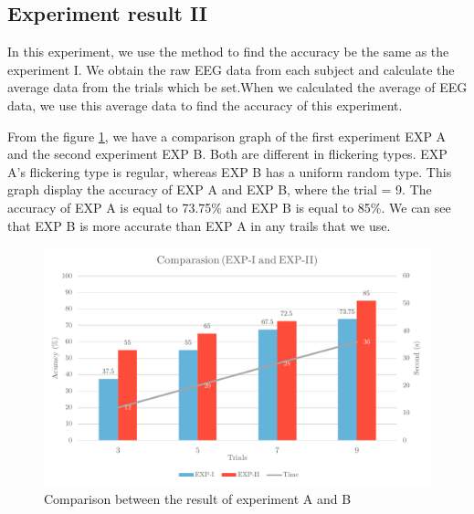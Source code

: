 \newpage
\subsection{Experiment result II}
\hspace{1.5cm} In this experiment, we use the method to find the accuracy be the same as the experiment I.
We obtain the raw EEG data from each subject and calculate the average data from the trials which be set.When we calculated the average of EEG data, we use this average data to find the accuracy of this experiment.

From the figure \ref{fig:comp2}, we have a comparison graph of the first experiment EXP A and the second experiment EXP B. Both are different in flickering types. EXP A's flickering type is regular, whereas EXP B has a uniform random type. This graph display the accuracy of EXP A and EXP B, where the trial = 9. The accuracy of EXP A is equal to 73.75\% and EXP B is equal to 85\%. We can see that EXP B is more accurate than EXP A in any trails that we use.

\begin{figure}[ht]
	\centering
	\includegraphics[scale = 0.8]{chapter7/result_12_2.pdf}
	\caption{Comparison between the result of experiment A and B}
    \label{fig:comp2}
\end{figure}

